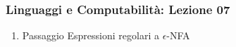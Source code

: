 




\begin{frame}[fragile]
	\frametitle{Linguaggi e Computabilità: Lezione 07}
\begin{enumerate}
\item
Passaggio Espressioni regolari a $\epsilon$-NFA
\end{enumerate}
\end{frame}



